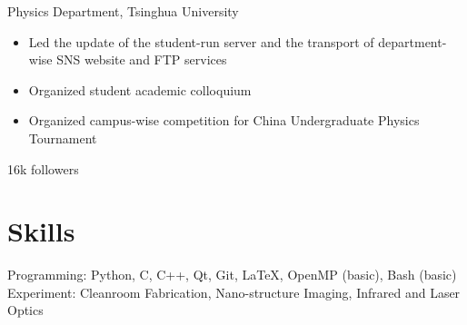 \documentclass[11pt,letterpaper]{resume}
\begin{document}
Physics Department, Tsinghua University
\begin{itemize}
    \item Led the update of the student-run server and 
    the transport of department-wise SNS website and FTP services
    \item Organized student academic colloquium 
    \item Organized campus-wise competition for China Undergraduate Physics 
    Tournament
\end{itemize}\medskip

16k followers

\section{Skills}
Programming: Python, C, C++, Qt, Git, \LaTeX, OpenMP (basic), Bash (basic)\\
Experiment: Cleanroom Fabrication, Nano-structure Imaging, 
Infrared and Laser Optics
\end{document}
